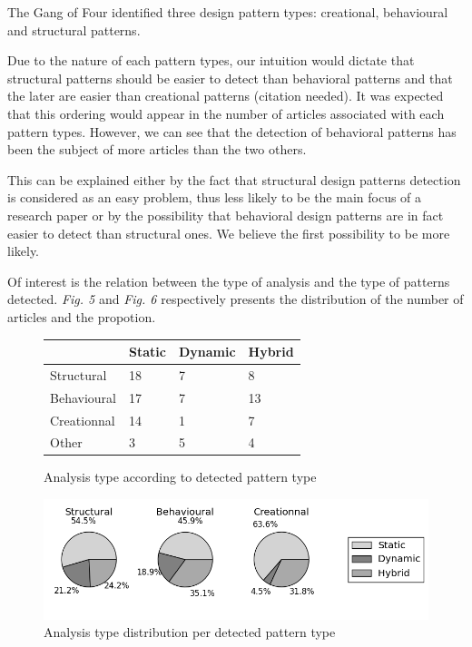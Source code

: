\documentclass[letterpaper, 10 pt, conference]{ieeeconf}  %
\begin{document}
The Gang of Four identified three design pattern types: creational,
behavioural and structural patterns.

Due to the nature of each pattern types, our intuition would dictate that
structural patterns should be easier to detect than behavioral patterns and
that the later are easier than creational patterns (citation needed). 
It was expected that this ordering would appear in the number of articles
associated with each pattern types. 
However, we can see that the detection of behavioral patterns has been the
subject of more articles than the two others.


This can be explained either by the fact that structural design patterns
detection is considered as an easy problem, thus less likely to be the main
focus of a research paper or by the possibility that behavioral design
patterns are in fact easier to detect than structural ones.
We believe the first possibility to be more likely.

Of interest is the relation between the type of analysis and the type of
patterns detected. \textit{Fig. 5} and \textit{Fig. 6}
respectively presents the distribution of the number of articles and the
propotion.


\begin{figure}
 \centering
 \begin{tabular}{llll}
             & Static & Dynamic & Hybrid \\
 \hline
 Structural  & 18 & 7 & 8 \\
 Behavioural & 17 & 7 & 13 \\
 Creationnal & 14 & 1 & 7 \\
 Other       & 3 & 5 & 4 \\
 \end{tabular}
 \caption{Analysis type according to detected pattern type}
\end{figure}

\begin{figure}[tb]
 \centering
 \includegraphics[scale=0.7]{analysis_v_pattern.png}
 \caption{Analysis type distribution per detected pattern type}
\end{figure}
\end{document}
